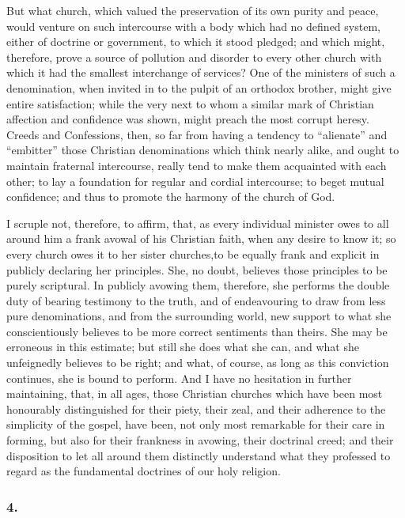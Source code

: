 \documentclass[
]{book}
\begin{document}
But what church, which valued the preservation of its own purity and peace, would venture on such intercourse with a body which had no defined system, either of doctrine or government, to which it stood pledged; and which might, therefore, prove a source of pollution and disorder to every other church with which it had the smallest interchange of services? One of the ministers of such a denomination, when invited in to the pulpit of an orthodox brother, might give entire satisfaction; while the very next to whom a similar mark of Christian affection and confidence was shown, might preach the most corrupt heresy. Creeds and Confessions, then, so far from having a tendency to ``alienate'' and ``embitter'' those Christian denominations which think nearly alike, and ought to maintain fraternal intercourse, really tend to make them acquainted with each other; to lay a foundation for regular and cordial intercourse; to beget mutual confidence; and thus to promote the harmony of the church of God.

I scruple not, therefore, to affirm, that, as every individual minister owes to all around him a frank avowal of his Christian faith, when any desire to know it; so every church owes it to her sister churches,to be equally frank and explicit in publicly declaring her principles. She, no doubt, believes those principles to be purely scriptural. In publicly avowing them, therefore, she performs the double duty of bearing testimony to the truth, and of endeavouring to draw from less pure denominations, and from the surrounding world, new support to what she conscientiously believes to be more correct sentiments than theirs. She may be erroneous in this estimate; but still she does what she can, and what she unfeignedly believes to be right; and what, of course, as long as this conviction continues, she is bound to perform. And I have no hesitation in further maintaining, that, in all ages, those Christian churches which have been most honourably distinguished for their piety, their zeal, and their adherence to the simplicity of the gospel, have been, not only most remarkable for their care in forming, but also for their frankness in avowing, their doctrinal creed; and their disposition to let all around them distinctly understand what they professed to regard as the fundamental doctrines of our holy religion.

\hypertarget{section-3}{%
\subsubsection*{4.}\label{section-3}}
\end{document}
